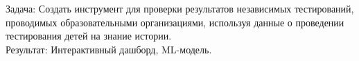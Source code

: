 \item {}
    Задача: Создать инструмент для проверки результатов независимых тестирований,
    проводимых образовательными организациями, используя данные о проведении тестирования
    детей на знание истории.\\
    Результат: Интерактивный дашборд, ML-модель.
